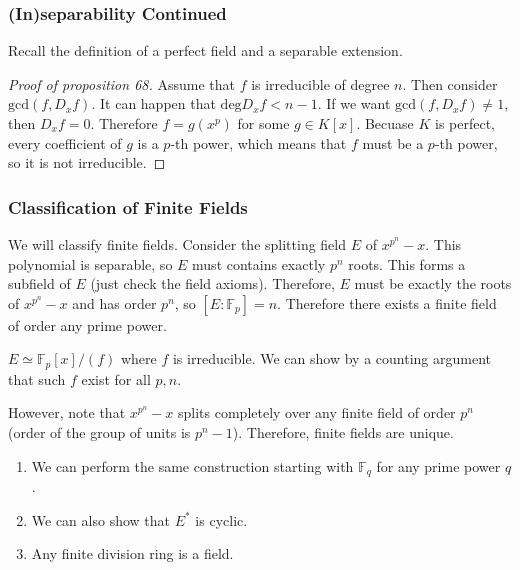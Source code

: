 \documentclass[10pt, twoside]{article}
\newcommand{\F}{\mathbb{F}}
\begin{document}
    \subsubsection{(In)separability Continued}

    Recall the definition of a perfect field and a separable extension.

    \begin{proof}[Proof of proposition 68]
        Assume that $f$ is irreducible of degree $n$. Then consider $\mathrm{gcd}(f, D_xf)$. It can happen that $\mathrm{deg}D_xf < n-1$. If we want $\mathrm{gcd}(f, D_xf) \neq 1$, then $D_xf = 0$. Therefore $f = g(x^p)$ for some $g \in K[x]$. Becuase $K$ is perfect, every coefficient of $g$ is a $p$-th power, which means that $f$ must be a $p$-th power, so it is not irreducible.
    \end{proof}

    \subsubsection{Classification of Finite Fields}

    We will classify finite fields. Consider the splitting field $E$ of $x^{p^n}-x$. This polynomial is separable, so $E$ must contains exactly $p^n$ roots. This forms a subfield of $E$ (just check the field axioms). Therefore, $E$ must be exactly the roots of $x^{p^n}-x$ and has order $p^n$, so $[E:\F_p] = n$. Therefore there exists a finite field of order any prime power.

    \begin{rmk}
        $E \simeq \F_p[x]/(f)$ where $f$ is irreducible. We can show by a counting argument that such $f$ exist for all $p,n$.
    \end{rmk}

    However, note that $x^{p^n}-x$ splits completely over any finite field of order $p^{n}$ (order of the group of units is $p^n-1$). Therefore, finite fields are unique.

    \begin{rmk}
        \begin{enumerate}
            \item We can perform the same construction starting with $\F_q$ for any prime power $q$.
            \item We can also show that $E^*$ is cyclic.
            \item Any finite division ring is a field.
        \end{enumerate}
    \end{rmk}
\end{document}
